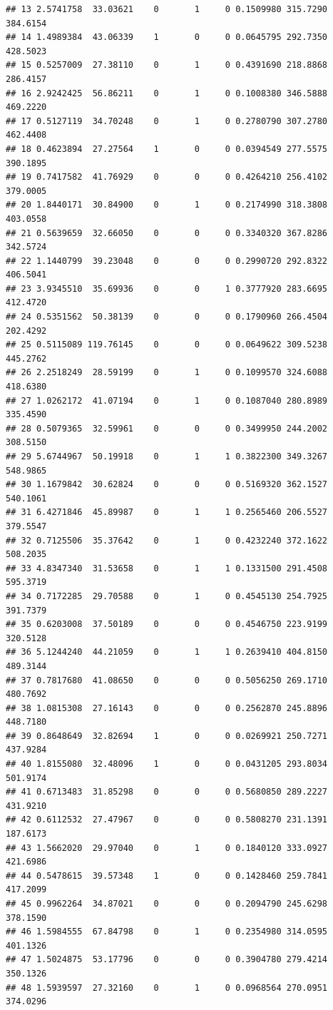 \documentclass[]{article}
\begin{document}
\begin{verbatim}
## 13 2.5741758  33.03621    0       1     0 0.1509980 315.7290 384.6154
## 14 1.4989384  43.06339    1       0     0 0.0645795 292.7350 428.5023
## 15 0.5257009  27.38110    0       1     0 0.4391690 218.8868 286.4157
## 16 2.9242425  56.86211    0       1     0 0.1008380 346.5888 469.2220
## 17 0.5127119  34.70248    0       1     0 0.2780790 307.2780 462.4408
## 18 0.4623894  27.27564    1       0     0 0.0394549 277.5575 390.1895
## 19 0.7417582  41.76929    0       0     0 0.4264210 256.4102 379.0005
## 20 1.8440171  30.84900    0       1     0 0.2174990 318.3808 403.0558
## 21 0.5639659  32.66050    0       0     0 0.3340320 367.8286 342.5724
## 22 1.1440799  39.23048    0       0     0 0.2990720 292.8322 406.5041
## 23 3.9345510  35.69936    0       0     1 0.3777920 283.6695 412.4720
## 24 0.5351562  50.38139    0       0     0 0.1790960 266.4504 202.4292
## 25 0.5115089 119.76145    0       0     0 0.0649622 309.5238 445.2762
## 26 2.2518249  28.59199    0       1     0 0.1099570 324.6088 418.6380
## 27 1.0262172  41.07194    0       1     0 0.1087040 280.8989 335.4590
## 28 0.5079365  32.59961    0       0     0 0.3499950 244.2002 308.5150
## 29 5.6744967  50.19918    0       1     1 0.3822300 349.3267 548.9865
## 30 1.1679842  30.62824    0       0     0 0.5169320 362.1527 540.1061
## 31 6.4271846  45.89987    0       1     1 0.2565460 206.5527 379.5547
## 32 0.7125506  35.37642    0       1     0 0.4232240 372.1622 508.2035
## 33 4.8347340  31.53658    0       1     1 0.1331500 291.4508 595.3719
## 34 0.7172285  29.70588    0       1     0 0.4545130 254.7925 391.7379
## 35 0.6203008  37.50189    0       0     0 0.4546750 223.9199 320.5128
## 36 5.1244240  44.21059    0       1     1 0.2639410 404.8150 489.3144
## 37 0.7817680  41.08650    0       0     0 0.5056250 269.1710 480.7692
## 38 1.0815308  27.16143    0       0     0 0.2562870 245.8896 448.7180
## 39 0.8648649  32.82694    1       0     0 0.0269921 250.7271 437.9284
## 40 1.8155080  32.48096    1       0     0 0.0431205 293.8034 501.9174
## 41 0.6713483  31.85298    0       0     0 0.5680850 289.2227 431.9210
## 42 0.6112532  27.47967    0       0     0 0.5808270 231.1391 187.6173
## 43 1.5662020  29.97040    0       1     0 0.1840120 333.0927 421.6986
## 44 0.5478615  39.57348    1       0     0 0.1428460 259.7841 417.2099
## 45 0.9962264  34.87021    0       0     0 0.2094790 245.6298 378.1590
## 46 1.5984555  67.84798    0       1     0 0.2354980 314.0595 401.1326
## 47 1.5024875  53.17796    0       0     0 0.3904780 279.4214 350.1326
## 48 1.5939597  27.32160    0       1     0 0.0968564 270.0951 374.0296

\end{verbatim}
\end{document}
